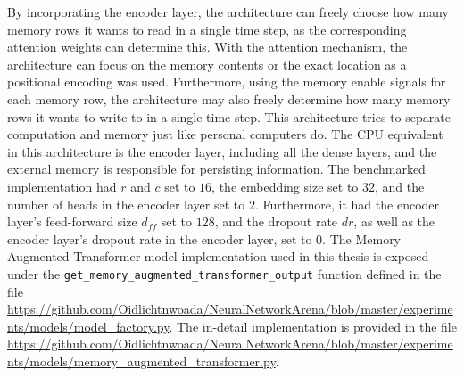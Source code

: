 \documentclass[draft,final]{vutinfth} %
\begin{document}
    By incorporating the encoder layer, the architecture can freely choose how many memory rows it wants to read in a single time step, as the corresponding attention weights can determine this.
    With the attention mechanism, the architecture can focus on the memory contents or the exact location as a positional encoding was used.
    Furthermore, using the memory enable signals for each memory row, the architecture may also freely determine how many memory rows it wants to write to in a single time step.
    This architecture tries to separate computation and memory just like personal computers do.
    The CPU equivalent in this architecture is the encoder layer, including all the dense layers, and the external memory is responsible for persisting information.
    The benchmarked implementation had $r$ and $c$ set to $16$, the embedding size set to $32$, and the number of heads in the encoder layer set to $2$. Furthermore, it had the encoder layer's feed-forward size $d_{ff}$ set to $128$, and the dropout rate $dr$, as well as the encoder layer's dropout rate in the encoder layer, set to $0$.
    The Memory Augmented Transformer model implementation used in this thesis is exposed under the \texttt{get\_memory\_augmented\_transformer\_output} function defined in the file \url{https://github.com/Oidlichtnwoada/NeuralNetworkArena/blob/master/experiments/models/model_factory.py}.
    The in-detail implementation is provided in the file \url{https://github.com/Oidlichtnwoada/NeuralNetworkArena/blob/master/experiments/models/memory_augmented_transformer.py}.
\end{document}
